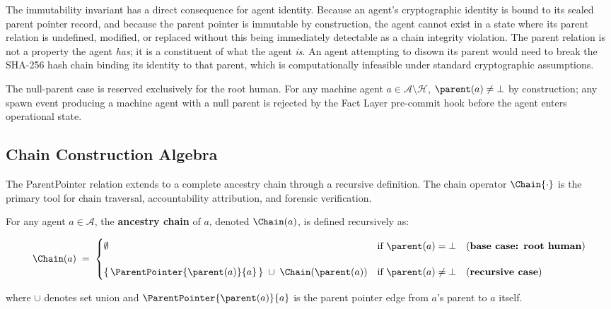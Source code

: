 The immutability invariant has a direct consequence for agent identity. Because an agent's cryptographic identity is bound to its sealed parent pointer record, and because the parent pointer is immutable by construction, the agent cannot exist in a state where its parent relation is undefined, modified, or replaced without this being immediately detectable as a chain integrity violation. The parent relation is not a property the agent \emph{has}; it is a constituent of what the agent \emph{is}. An agent attempting to disown its parent would need to break the SHA-256 hash chain binding its identity to that parent, which is computationally infeasible under standard cryptographic assumptions.

The null-parent case is reserved exclusively for the root human. For any machine agent $a \in \mathcal{A} \setminus \mathcal{H}$, $\parent(a) \neq \bot$ by construction; any spawn event producing a machine agent with a null parent is rejected by the Fact Layer pre-commit hook before the agent enters operational state.

\subsection{Chain Construction Algebra}
\label{sec:chain_algebra}

The ParentPointer relation extends to a complete ancestry chain through a recursive definition. The chain operator $\Chain{\cdot}$ is the primary tool for chain traversal, accountability attribution, and forensic verification.

\begin{definition}
\label{def:chain}
For any agent $a \in \mathcal{A}$, the \textbf{ancestry chain} of $a$, denoted $\Chain(a)$, is defined recursively as:

\begin{equation}
\Chain(a) \;=\;
\begin{cases}
\emptyset & \text{if } \parent(a) = \bot \quad \text{(\textbf{base case: root human})} \\[12pt]
\{\,\ParentPointer{\parent(a)}{a}\,\} \; \cup\; \Chain(\parent(a)) & \text{if } \parent(a) \neq \bot \quad \text{(\textbf{recursive case})}
\end{cases}
\label{eq:chain_recursive}
\end{equation}

where $\cup$ denotes set union and $\ParentPointer{\parent(a)}{a}$ is the parent pointer edge from $a$'s parent to $a$ itself.
\end{definition}

